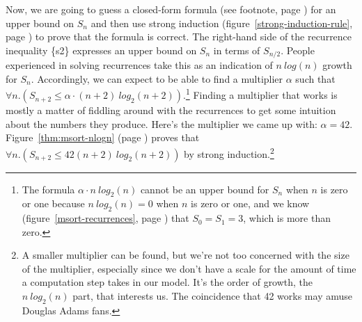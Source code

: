 Now, we are going to guess a closed-form formula
(see footnote, page \pageref{footnote:closed-form})
for an upper bound on $S_n$
and then use strong induction
(figure~\ref{strong-induction-rule}, page \pageref{strong-induction-rule})
to prove that the formula is correct.
The right-hand side of the recurrence inequality \{s2\} expresses
an upper bound on $S_n$ in terms of $S_{n/2}$.
People experienced in solving recurrences take this as an
indication of $n~log(n)$ growth for $S_n$.
Accordingly, we can expect to be able to find a multiplier $\alpha$ such that
$\forall n.(S_{n+2} \leq \alpha \cdot (n+2)~log_2(n+2))$.\footnote{The
formula $\alpha\cdot n~log_2(n)$ cannot be an upper bound for $S_n$
when $n$ is zero or one because $n~log_2(n) = 0$ when $n$ is zero or one,
and we know
(figure~\ref{msort-recurrences}, page \pageref{msort-recurrences})
that $S_0 = S_1 = 3$, which is more than zero.}
Finding a multiplier that works is mostly a matter of
fiddling around with the recurrences to get some intuition
about the numbers they produce.
Here's the multiplier we came up with:
$\alpha = 42$.
Figure~\ref{thm:msort-nlogn} (page \pageref{thm:msort-nlogn})
proves that
$\forall n.(S_{n+2} \leq 42(n+2)~log_2(n+2))$
by strong induction.\footnote{A
smaller multiplier can be found, but
we're not too concerned with the size of the multiplier,
especially since we don't have a scale for the amount of time
a computation step takes in our model.
It's the order of growth, the $n~log_2(n)$ part, that interests us.
The coincidence that 42 works may amuse Douglas Adams fans.}

